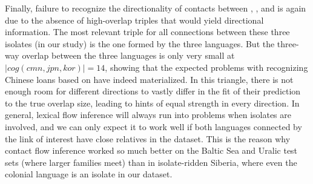  Finally, failure to recognize the directionality of contacts between , , and  is again due to the absence of high-overlap triples that would yield directional information. The most relevant triple for all connections between these three isolates (in our study) is the one formed by the three languages. But the three-way overlap between the three languages is only very small at $|cog(cmn,jpn,kor)| = 14$, showing that the expected problems with recognizing Chinese loans based on  have indeed materialized. In this triangle, there is not enough room for different directions to vastly differ in the fit of their prediction to the true overlap size, leading to hints of equal strength in every direction. In general, lexical flow inference will always run into problems when isolates are involved, and we can only expect it to work well if both languages connected by the link of interest have close relatives in the dataset. This is the reason why contact flow 
inference worked so much better on the Baltic Sea and Uralic test sets (where larger families meet) than in isolate-ridden Siberia, where even the colonial language is an isolate in our dataset.
 
